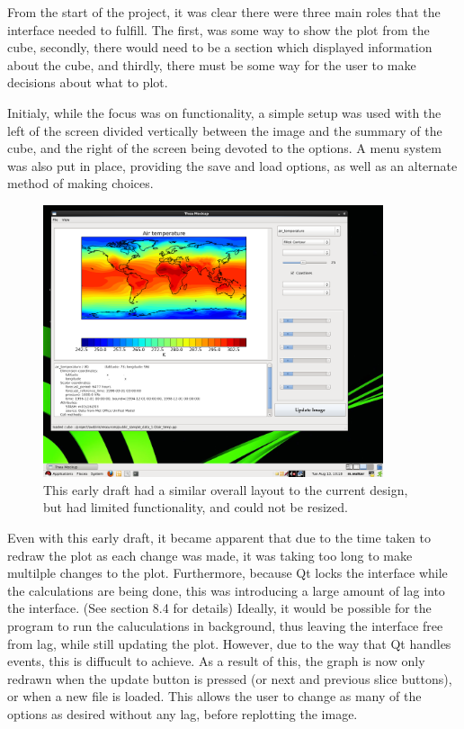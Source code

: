 \documentclass[whitecover]{MO_report}
\begin{document}
From the start of the project, it was clear there were three main roles that
the interface needed to fulfill. The first, was some way to show the plot from
the cube, secondly, there would need to be a section which displayed information
about the cube, and thirdly, there must be some way for the user to make
decisions about what to plot.

Initialy, while the focus was on functionality, a simple setup was used with
the left of the screen divided vertically between the image and the summary of
the cube, and the right of the screen being devoted to the options.
A menu system was also put in place, providing the save and load options, as
well as an alternate method of making choices.

\begin{figure}[ht!]
\centering
\includegraphics[width=100mm]{resources/version1.png}
\caption{This early draft had a similar overall layout to the current design,
but had limited functionality, and could not be resized.}
\label{overflow}
\end{figure}

Even with this early draft, it became apparent that due to the time taken to
redraw the plot as each change was made, it was taking too long to make
multilple changes to the plot. Furthermore, because Qt locks the interface
while the calculations are being done, this was introducing a large amount of
lag into the interface. (See section 8.4 for details) Ideally, it would be
possible for the program to run the caluculations in background, thus leaving
the interface free from lag, while still updating the plot. However, due to the
way that Qt handles events, this is diffucult to achieve. As a result of this,
the graph is now only redrawn when the update button is pressed (or next and
previous slice buttons), or when a new file is loaded. This allows the user to
change as many of the options as desired without any lag, before replotting the
image.
\end{document}

